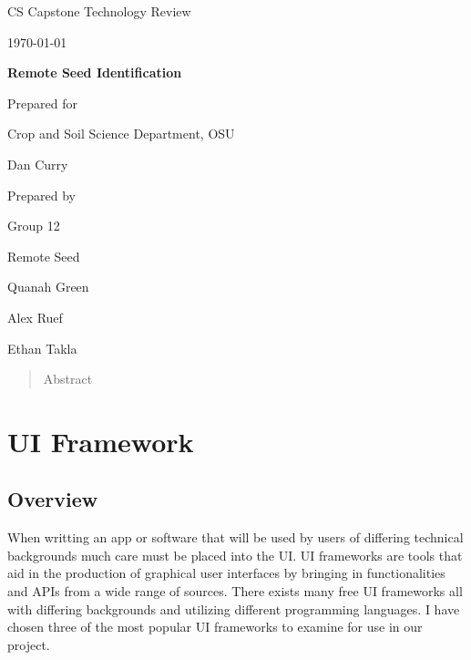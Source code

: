 \documentclass[onecolumn, draftclsnofoot,10pt, compsoc]{IEEEtran}
\def \CapstoneTeamName{		Remote Seed}
\def \CapstoneTeamNumber{		12}
\def \GroupMemberOne{			Quanah Green}
\def \GroupMemberTwo{			Alex Ruef}
\def \GroupMemberThree{			Ethan Takla}
\def \CapstoneProjectName{		Remote Seed Identification}
\def \CapstoneSponsorCompany{	Crop and Soil Science Department, OSU}
\def \CapstoneSponsorPerson{		Dan Curry}
\def \DocType{		%
				Technology Review
				}
\newcommand{\NameSigPair}[1]{\par
\makebox[2.75in][r]{#1} \hfil 	\makebox[3.25in]{\makebox[2.25in]{\hrulefill} \hfill		\makebox[.75in]{\hrulefill}}
\par\vspace{-12pt} \textit{\tiny\noindent
\makebox[2.75in]{} \hfil		\makebox[3.25in]{\makebox[2.25in][r]{Signature} \hfill	\makebox[.75in][r]{Date}}}}
\renewcommand{\NameSigPair}[1]{#1}
\begin{document}
\begin{titlepage}
    \begin{singlespace}
        \hfill 
        \par\vspace{.2in}
        \centering
        \scshape{
            \huge CS Capstone \DocType \par
            {\large\today}\par
            \vspace{.5in}
            \textbf{\Huge\CapstoneProjectName}\par
            \vfill
            {\large Prepared for}\par
            \Huge \CapstoneSponsorCompany\par
            \vspace{5pt}
            {\Large\NameSigPair{\CapstoneSponsorPerson}\par}
            {\large Prepared by }\par
            Group\CapstoneTeamNumber\par
            \CapstoneTeamName\par 
            \vspace{5pt}
            {\Large
                \NameSigPair{\GroupMemberOne}\par
                \NameSigPair{\GroupMemberTwo}\par
                \NameSigPair{\GroupMemberThree}\par
            }
            \vspace{20pt}
        }
        \begin{abstract}
        Abstract
        \end{abstract}     
    \end{singlespace}
\end{titlepage}
\newpage
{}
\tableofcontents
\clearpage
\section{UI Framework}
	\subsection{Overview}
		When writting an app or software that will be used by users of differing technical backgrounds much care must be placed into the UI.
		UI frameworks are tools that aid in the production of graphical user interfaces by bringing in functionalities and APIs from a wide range of sources.
		There exists many free UI frameworks all with differing backgrounds and utilizing different programming languages.
		I have chosen three of the most popular UI frameworks to examine for use in our project.
\end{document}
